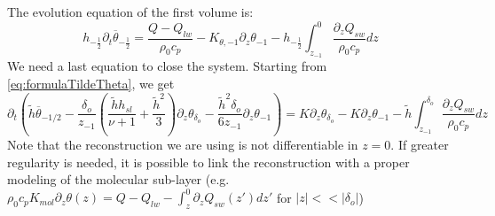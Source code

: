 The evolution equation of the first volume is:
\begin{equation}
h_{-\frac{1}{2}}\partial_t
\overline{\theta}_{-\frac{1}{2}} =
\frac{Q - Q_{lw}}{\rho_0 c_p}
- K_{\theta, -1} \partial_z \theta_{-1}
- h_{-\frac{1}{2}}\int_{z_{-1}}^0
\frac{\partial_z Q_{sw}}{\rho_0 c_p} dz
\end{equation}
We need a last equation to close the system.
Starting from \eqref{eq:formulaTildeTheta}, we get
\begin{equation}
\partial_t
\left(
\widetilde{h}\overline{\theta}_{-1/2}
	-\frac{\delta_o}{z_{-1}}\left(
\frac{\widetilde{h}h_{sl}}{\nu+1} + \frac{\widetilde{h}^2}{3}
\right)\partial_z \theta_{\delta_o}
	- \frac{\widetilde{h}^2\delta_o}{6z_{-1}}
\partial_z \theta_{-1}
\right)
	= K\partial_z \theta_{\delta_o}-
K\partial_z \theta_{-1}
- \widetilde{h}
\int^{\delta_o}_{z_{-1}}
\frac{\partial_z Q_{sw}}{\rho_0 c_p} dz
\end{equation}
Note that the reconstruction we are using is not differentiable
in $z=0$.
If greater regularity is needed, it is possible to link
the reconstruction with a proper modeling of the molecular sub-layer
(e.g. $\rho_0 c_p K_{mol} \partial_z \theta(z) =
Q - Q_{lw} - \int_z^0 \partial_z Q_{sw}(z')dz'$ for $|z|<<|\delta_o|$)

